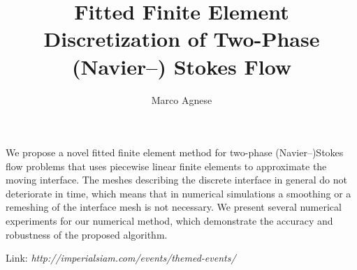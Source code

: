 \documentclass{article}
\begin{document}
\title{Fitted Finite Element Discretization of Two-Phase (Navier--) Stokes Flow}
\author{Marco Agnese}

\maketitle

We propose a novel fitted finite element method for two-phase (Navier--)Stokes
flow problems that uses piecewise linear finite elements to approximate the
moving interface. The meshes describing the discrete interface in general do not
deteriorate in time, which means that in numerical simulations a smoothing or a
remeshing of the interface mesh is not necessary. We present several numerical
experiments for our numerical method, which demonstrate the accuracy and
robustness of the proposed algorithm.
\newline

Link: \emph{http://imperialsiam.com/events/themed-events/}
\end{document}
